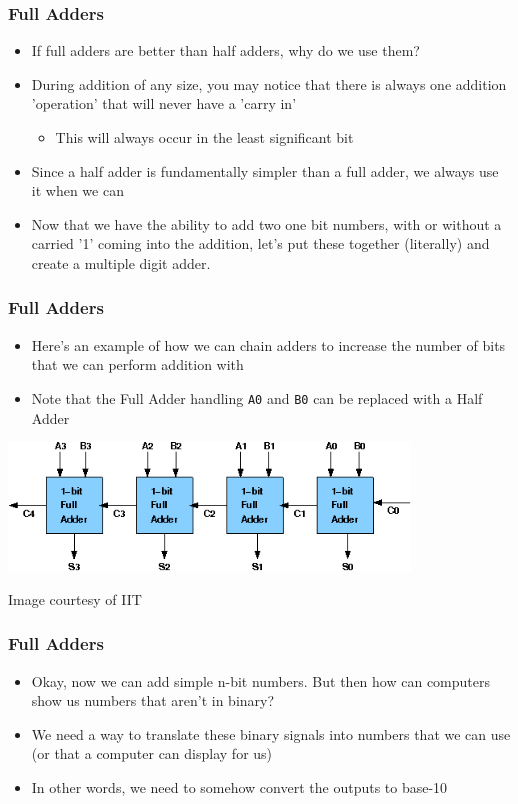 \documentclass{beamer}
\begin{document}
		\begin{frame}
			\frametitle{Full Adders}
			\begin{itemize}
				\item If full adders are better than half adders, why do we use them?
				\item During addition of any size, you may notice that there is always one addition 'operation' that will never have a 'carry in'
				\begin{itemize}
					\item This will always occur in the least significant bit
				\end{itemize}
				\item Since a half adder is fundamentally simpler than a full adder, we always use it when we can
				\item Now that we have the ability to add two one bit numbers, with or without a carried '1' coming into the addition, let's put these together (literally) and create a multiple digit adder.
			\end{itemize}
		\end{frame}
		
		
		\begin{frame}
			\frametitle{Full Adders}
			\begin{itemize}
				\item Here's an example of how we can chain adders to increase the number of bits that we can perform addition with
				\item Note that the Full Adder handling \texttt{A0} and \texttt{B0} can be replaced with a Half Adder\linebreak
			\end{itemize}
			
			
			
			\centering
			
			\includegraphics[width=0.8\textwidth]{4bitadder}
			
			\centering
			{\tiny Image courtesy of IIT}
			
		\end{frame}
		
		\begin{frame}
			\frametitle{Full Adders}
			
			\begin{itemize}
				\item Okay, now we can add simple n-bit numbers. But then how can computers show us numbers that aren't in binary?
				\item We need a way to translate these binary signals into numbers that we can use (or that a computer can display for us)
				\item In other words, we need to somehow convert the outputs to base-10
			\end{itemize}
			
		\end{frame}
		
\end{document}
